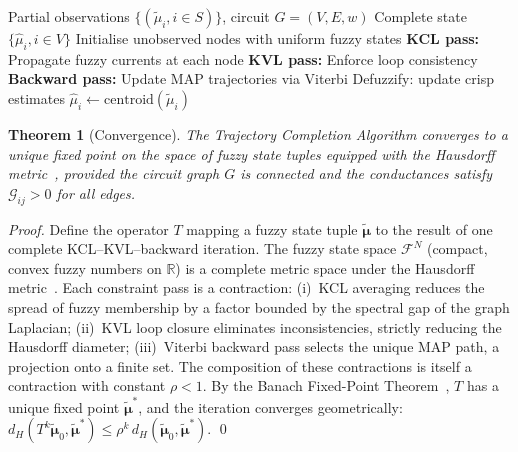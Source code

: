 \documentclass[11pt,twocolumn,a4paper]{article}
\newtheorem{theorem}{Theorem}[section]
\newcommand{\R}{\mathbb{R}}
\newcommand{\Gcond}{\mathcal{G}}
\begin{document}
\begin{algorithm}[H]
\caption{Trajectory Completion Algorithm}
\label{alg:completion}
\begin{algorithmic}[1]
\Require Partial observations $\{(\tilde{\mu}_i, i \in S)\}$,
  circuit $G = (V, E, w)$
\Ensure Complete state $\{\hat{\mu}_i, i \in V\}$
\State Initialise unobserved nodes with uniform fuzzy states
\Repeat
  \State \textbf{KCL pass:} Propagate fuzzy currents at each node
  \State \textbf{KVL pass:} Enforce loop consistency
  \State \textbf{Backward pass:} Update MAP trajectories via Viterbi
  \State Defuzzify: update crisp estimates
    $\hat{\mu}_i \gets \mathrm{centroid}(\tilde{\mu}_i)$
\end{algorithmic}
\end{algorithm}

\begin{theorem}[Convergence]
\label{thm:convergence}
The Trajectory Completion Algorithm converges to a unique fixed point
on the space of fuzzy state tuples equipped with the Hausdorff
metric~\citep{beer1993}, provided the circuit graph $G$ is connected
and the conductances satisfy $\Gcond_{ij} > 0$ for all edges.
\end{theorem}

\begin{proof}
Define the operator $T$ mapping a fuzzy state tuple
$\tilde{\boldsymbol{\mu}}$ to the result of one complete
KCL--KVL--backward iteration.  The fuzzy state space
$\mathcal{F}^N$ (compact, convex fuzzy numbers on $\R$) is a
complete metric space under the Hausdorff
metric~\citep{beer1993,kreyszig1978}.  Each constraint pass is
a contraction: (i)~KCL averaging reduces the spread of fuzzy
membership by a factor bounded by the spectral gap of the graph
Laplacian; (ii)~KVL loop closure eliminates inconsistencies, strictly
reducing the Hausdorff diameter; (iii)~Viterbi backward pass selects
the unique MAP path, a projection onto a finite set.  The composition
of these contractions is itself a contraction with constant
$\rho < 1$.  By the Banach Fixed-Point
Theorem~\citep{granas2003}, $T$ has a unique fixed point
$\tilde{\boldsymbol{\mu}}^*$, and the iteration converges
geometrically: $d_H(T^k\tilde{\boldsymbol{\mu}}_0,
\tilde{\boldsymbol{\mu}}^*) \leq \rho^k\,
d_H(\tilde{\boldsymbol{\mu}}_0,
\tilde{\boldsymbol{\mu}}^*)$.  \qed
\end{proof}


\end{document}
